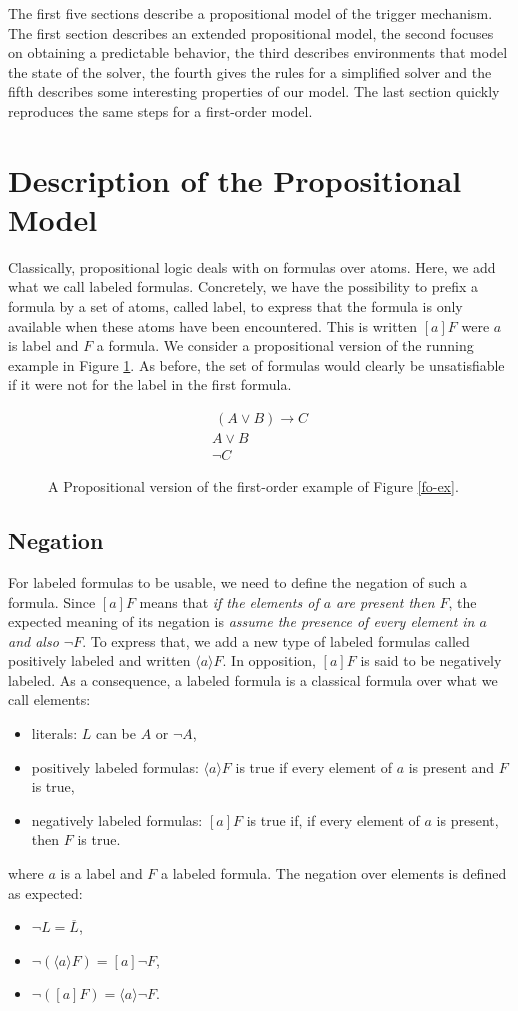 \documentclass[a4paper,11pt]{article}
\begin{document}
The first five sections describe a propositional model of the trigger mechanism. The first section
describes an extended propositional model, the second focuses on obtaining a predictable behavior,
the third describes environments that model the state of the solver, the fourth gives the rules for a
simplified solver and the fifth describes some interesting properties of our model.
The last section quickly reproduces the same steps for a first-order model.
\section{Description of the Propositional Model}
Classically, propositional logic deals with on formulas over atoms.
Here, we add what we call labeled formulas.
Concretely, we have the possibility to prefix a formula by a set of atoms, called label, to express
that the formula is only available when these atoms have been encountered. This is written $[a]F$
were $a$ is label and $F$ a formula.
We consider a propositional version of the running example in Figure \ref{p-ex}. As before, the set
of formulas would clearly be unsatisfiable if it were not for the label in the first formula.

\begin{figure}
\begin{eqnarray*}
 [A]~(A\vee B)\rightarrow C\\
 A\vee B\\
 \neg C
\end{eqnarray*}
\caption{\label{p-ex}A Propositional version of the first-order example of Figure \ref{fo-ex}.}
\end{figure}

\subsection{Negation}
For labeled formulas to be usable, we need to define the negation of such a formula. Since $[a]F$
means that \emph{if the elements of $a$ are present then $F$}, the expected meaning of its negation is
\emph{assume the presence of every element in $a$ and also $\neg F$}. To express that, we add a new type
of labeled formulas called positively labeled and written $\langle a\rangle F$. In opposition, $[a]F$
is said to be negatively labeled.
As a consequence, a labeled formula is a classical formula over what we call elements:
\begin{itemize}
 \item literals: $L$ can be $A$ or $\neg A$,
 \item positively labeled formulas: $\langle a\rangle F$ is true if every element of $a$ is present
and $F$ is true,
 \item negatively labeled formulas: $[a]F$ is true if, if every element of $a$ is present,
then $F$ is true.
\end{itemize}
where $a$ is a label and $F$ a labeled formula.
The negation over elements is defined as expected:
\begin{itemize}
 \item $\neg L=\overline L$,
 \item $\neg(\langle a\rangle F)=[a]\neg F$,
 \item $\neg([a]F)=\langle a\rangle\neg F$.
\end{itemize}
\end{document}

